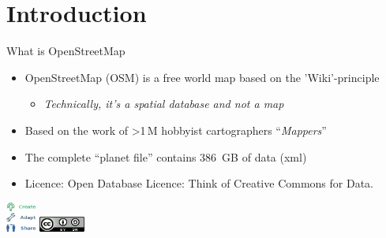 \documentclass{beamer}
\begin{document}
\section{Introduction}

\begin{frame}{What is OpenStreetMap}

\begin{itemize}
  \item OpenStreetMap (OSM) is a free world map based on the 'Wiki'-principle
  \begin{itemize}
    \item \emph{Technically, it's a spatial database and not a map}
  \end{itemize}
  \item Based on the work of \textgreater 1\,M hobbyist cartographers ``\emph{Mappers}''
  \item The complete ``planet file''  contains 386 \,GB of data (xml)
      \pause
  \item Licence: Open Database Licence: Think of Creative Commons for Data.
\end{itemize}

\begin{center}
\includegraphics[width=1cm]{ODbL.png}
\hspace{2cm}
\includegraphics[width=1.5cm]{cc-by-sa.png}
\end{center}


\end{frame}
\end{document}

